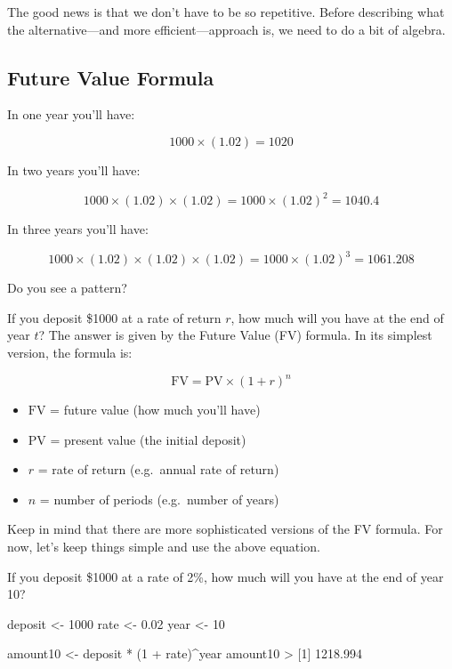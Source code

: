 \documentclass[
]{book}
\newenvironment{Shaded}{\begin{snugshade}}{\end{snugshade}}
\newcommand{\DecValTok}[1]{\textcolor[rgb]{0.00,0.00,0.81}{#1}}
\newcommand{\FloatTok}[1]{\textcolor[rgb]{0.00,0.00,0.81}{#1}}
\newcommand{\NormalTok}[1]{#1}
\newcommand{\OtherTok}[1]{\textcolor[rgb]{0.56,0.35,0.01}{#1}}
\newcommand{\SpecialCharTok}[1]{\textcolor[rgb]{0.00,0.00,0.00}{#1}}
\begin{document}
The good news is that we don't have to be so repetitive. Before describing what
the alternative---and more efficient---approach is, we need to do a bit of algebra.

\hypertarget{future-value-formula}{%
\subsection{Future Value Formula}\label{future-value-formula}}

In one year you'll have:

\[
1000 \times (1.02) = 1020
\]

In two years you'll have:

\[
1000 \times (1.02) \times (1.02) = 1000 \times (1.02)^2 = 1040.4
\]

In three years you'll have:

\[
1000 \times (1.02) \times (1.02) \times (1.02) = 1000 \times (1.02)^3 = 1061.208
\]

Do you see a pattern?

If you deposit \$1000 at a rate of return \(r\), how much will you have at the
end of year \(t\)? The answer is given by the Future Value (FV) formula. In its
simplest version, the formula is:

\[
\text{FV} = \text{PV} \times (1 + r)^n
\]

\begin{itemize}
\item
  \(\text{FV}\) = future value (how much you'll have)
\item
  \(\text{PV}\) = present value (the initial deposit)
\item
  \(r\) = rate of return (e.g.~annual rate of return)
\item
  \(n\) = number of periods (e.g.~number of years)
\end{itemize}

Keep in mind that there are more sophisticated versions of the FV formula.
For now, let's keep things simple and use the above equation.

If you deposit \$1000 at a rate of 2\%, how much will you have at the end of
year 10?

\begin{Shaded}
\begin{Highlighting}[]
\NormalTok{deposit }\OtherTok{\textless{}{-}} \DecValTok{1000}
\NormalTok{rate }\OtherTok{\textless{}{-}} \FloatTok{0.02}
\NormalTok{year }\OtherTok{\textless{}{-}} \DecValTok{10}

\NormalTok{amount10 }\OtherTok{\textless{}{-}}\NormalTok{ deposit }\SpecialCharTok{*}\NormalTok{ (}\DecValTok{1} \SpecialCharTok{+}\NormalTok{ rate)}\SpecialCharTok{\^{}}\NormalTok{year}
\NormalTok{amount10}
\SpecialCharTok{\textgreater{}}\NormalTok{ [}\DecValTok{1}\NormalTok{] }\FloatTok{1218.994}
\end{Highlighting}
\end{Shaded}
\end{document}
